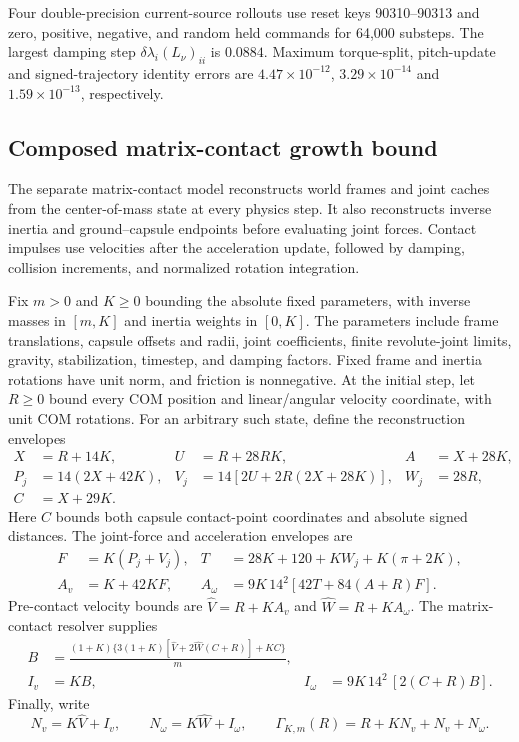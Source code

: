 Four double-precision current-source rollouts use reset keys 90310--90313 and zero, positive, negative, and random held commands for 64,000 substeps.
The largest damping step $\delta\lambda_i(L_\nu)_{ii}$ is $0.0884$.
Maximum torque-split, pitch-update and signed-trajectory identity errors are $4.47\times10^{-12}$, $3.29\times10^{-14}$ and $1.59\times10^{-13}$, respectively.

\subsection{Composed matrix-contact growth bound}
\label{app:matrix_growth}

The separate matrix-contact model reconstructs world frames and joint caches from the center-of-mass state at every physics step.
It also reconstructs inverse inertia and ground--capsule endpoints before evaluating joint forces.
Contact impulses use velocities after the acceleration update, followed by damping, collision increments, and normalized rotation integration.

Fix $m>0$ and $K\ge0$ bounding the absolute fixed parameters, with inverse masses in $[m,K]$ and inertia weights in $[0,K]$.
The parameters include frame translations, capsule offsets and radii, joint coefficients, finite revolute-joint limits, gravity, stabilization, timestep, and damping factors.
Fixed frame and inertia rotations have unit norm, and friction is nonnegative.
At the initial step, let $R\ge0$ bound every COM position and linear/angular velocity coordinate, with unit COM rotations.
For an arbitrary such state, define the reconstruction envelopes
\begin{align}
 X&=R+14K, & U&=R+28RK, & A&=X+28K,\nonumber\\
 P_j&=14(2X+42K), & V_j&=14[2U+2R(2X+28K)], & W_j&=28R,\nonumber\\
 C&=X+29K.
\end{align}
Here $C$ bounds both capsule contact-point coordinates and absolute signed distances.
The joint-force and acceleration envelopes are
\begin{align}
 F&=K(P_j+V_j), & T&=28K+120+KW_j+K(\pi+2K),\nonumber\\
 A_v&=K+42KF, & A_\omega&=9K\,14^2[42T+84(A+R)F].
\end{align}
Pre-contact velocity bounds are $\widehat V=R+KA_v$ and $\widehat W=R+KA_\omega$.
The matrix-contact resolver supplies
\begin{align}
 B&=\frac{(1+K)\{3(1+K)[\widehat V+2\widehat W(C+R)]+KC\}}{m},\nonumber\\
 I_v&=KB, & I_\omega&=9K\,14^2\,[2(C+R)B].
\end{align}
Finally, write
\begin{equation}
 N_v=K\widehat V+I_v,\qquad N_\omega=K\widehat W+I_\omega,\qquad
 \Gamma_{K,m}(R)=R+KN_v+N_v+N_\omega.
\end{equation}


